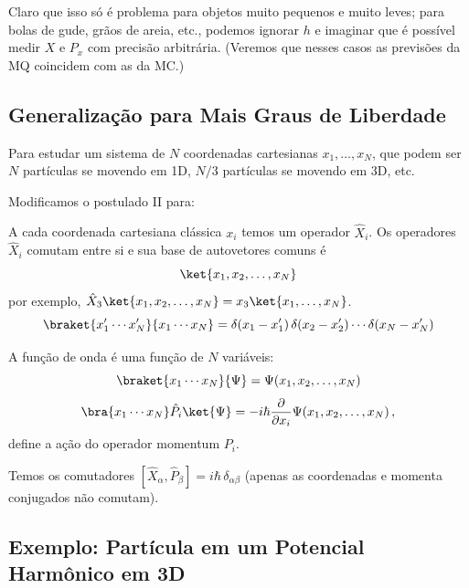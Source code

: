 Claro que isso só é problema para objetos muito pequenos e muito leves; para bolas de gude, grãos de areia, etc., podemos ignorar $h$ e imaginar que é possível medir $X$ e $P_x$ com precisão arbitrária. (Veremos que nesses casos as previsões da MQ coincidem com as da MC.)

\subsection*{Generalização para Mais Graus de Liberdade}

Para estudar um sistema de $N$ coordenadas cartesianas $x_1, \dots, x_N$, que podem ser $N$ partículas se movendo em 1D, $N/3$ partículas se movendo em 3D, etc.

Modificamos o postulado II para:

A cada coordenada cartesiana clássica $x_i$ temos um operador $\hat{X}_i$. Os operadores $\hat{X}_i$ comutam entre si e sua base de autovetores comuns é
\begin{equation}
    \ket{x_1, x_2, \dots, x_N}
\label{eq:aula13_base_multipla}
\end{equation}
por exemplo, $\hat{X}_3 \ket{x_1, x_2, \dots, x_N} = x_3 \ket{x_1, \dots, x_N}$.
\begin{equation}
    \braket{x_1' \cdots x_N'}{x_1 \cdots x_N} = \delta(x_1 - x_1')\,\delta(x_2 - x_2') \cdots \delta(x_N - x_N')
\label{eq:aula13_ortonormalidade_multipla}
\end{equation}

A função de onda é uma função de $N$ variáveis:
\begin{equation}
    \braket{x_1 \cdots x_N}{\Psi} = \Psi(x_1, x_2, \dots, x_N)
\label{eq:aula13_funcao_onda_N}
\end{equation}
\begin{equation}
    \bra{x_1 \cdots x_N}\hat{P}_i\ket{\Psi} = -i\hbar \frac{\partial}{\partial x_i} \Psi(x_1, x_2, \dots, x_N) \, ,
\label{eq:aula13_Pi_def}
\end{equation}
define a ação do operador momentum $P_i$.

Temos os comutadores $[\hat{X}_\alpha, \hat{P}_\beta] = i\hbar\,\delta_{\alpha\beta}$ (apenas as coordenadas e momenta conjugados não comutam).

\subsection*{Exemplo: Partícula em um Potencial Harmônico em 3D}

